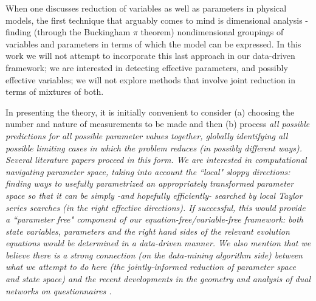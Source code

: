 \documentclass{article}
\begin{document}
When one discusses reduction of variables as well as parameters in physical models, the first technique
that arguably comes to mind is dimensional analysis - finding (through the Buckingham $\pi$ theorem)
nondimensional groupings of variables and parameters in terms of which the model can be expressed.
%
In this work we will not attempt to incorporate this last approach in our data-driven framework; we are
interested in detecting effective parameters, and possibly effective variables; we will not explore
methods that involve joint reduction in terms of mixtures of both. 


In presenting the theory, it is initially convenient to consider (a) choosing the number and nature of
measurements to be made and then (b) process \em{all possible} predictions for \em{all possible} 
parameter values together, globally identifying \em{all possible} limiting cases in which the
problem reduces (in possibly different ways). 
%
Several literature papers proceed in this form.
%
We are interested in computational navigating parameter space, taking into account the ``local"
sloppy directions: finding ways to usefully parametrized an appropriately transformed parameter
space so that it can be simply -and hopefully efficiently- searched by local Taylor series
searches (in the right effective directions). 
%
If successful, this would provide a ``parameter free" component of our equation-free/variable-free
framework: both state variables, parameters and the right hand sides of the relevant evolution equations
would be determined in a data-driven manner.
%
We also mention that we believe there is a strong connection (on the data-mining algorithm side) between
what we attempt to do here (the jointly-informed reduction of parameter space and state space) and the
recent developments in the geometry and analysis of dual networks on questionnaires \cite{A14}.
\end{document}
